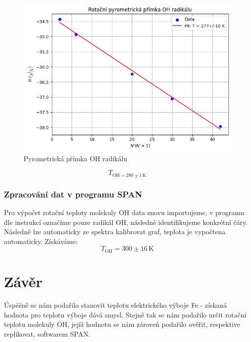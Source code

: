 \documentclass[czech,11pt,a4paper]{article}
\begin{document}
\begin{multicols}{2}
		\begin{figure}[H]
			\centering
			\includegraphics[width=0.9\linewidth]{pyrometrika2}
			\caption{Pyrometrická přímka OH radikálu}			
		\end{figure}
		\begin{equation*}
			T_{\mathrm{OH} = 280 \pm 1 \,\mathrm{K}}
		\end{equation*}
		\subsubsection{Zpracování dat v programu SPAN}
		
		Pro výpočet rotační teploty molekuly OH data znovu importujeme, v programu dle instrukcí označíme pouze radikál OH, následně identifikujeme konkrétní čáry. Následně lze automaticky ze spektra kalibrovat graf, teplota je vypočtena automaticky. Získáváme:
		\begin{equation*}
			T_{\mathrm{OH}}= 300 \pm 16 \,\mathrm{K}
		\end{equation*}
		
		
		
		
		\section{Závěr}
		Úspěšně se nám podařilo stanovit teplotu elektrického výboje Fe - získaná hodnota pro teplotu výboje dává smysl. Stejně tak se nám podařilo určit rotační teplotu molekuly OH, jejíž hodnotu se nám zároveň podařilo ověřit, respektive replikovat, softwarem SPAN.
		
\printbibliography
\newpage

			\end{multicols}
\end{document}
